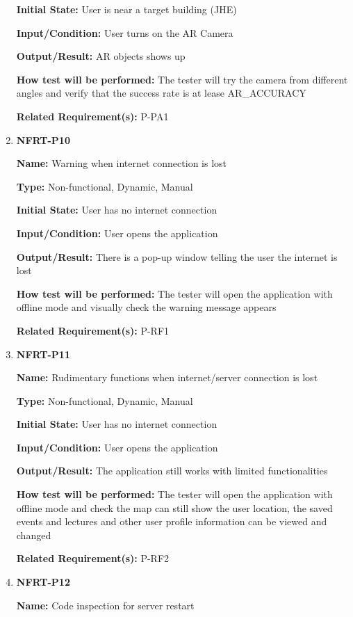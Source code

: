 \documentclass[12pt, titlepage]{article}
\begin{document}
\begin{enumerate}
\textbf{Initial State:} User is near a target building (JHE)
					
\textbf{Input/Condition:} User turns on the AR Camera
					
\textbf{Output/Result:} AR objects shows up

\textbf{How test will be performed:} The tester will try the camera from different angles and verify that the success rate is at lease AR\_ACCURACY

\textbf{Related Requirement(s):} P-PA1

\item{\textbf{NFRT-P10}}

\textbf{Name:} Warning when internet connection is lost

\textbf{Type:} Non-functional, Dynamic, Manual
					
\textbf{Initial State:} User has no internet connection
					
\textbf{Input/Condition:} User opens the application
					
\textbf{Output/Result:} There is a pop-up window telling the user the internet is lost

\textbf{How test will be performed:} The tester will open the application with offline mode and visually check the warning message appears

\textbf{Related Requirement(s):} P-RF1

\item{\textbf{NFRT-P11}}

\textbf{Name:} Rudimentary functions when internet/server connection is lost

\textbf{Type:} Non-functional, Dynamic, Manual
					
\textbf{Initial State:} User has no internet connection
					
\textbf{Input/Condition:} User opens the application
					
\textbf{Output/Result:} The application still works with limited functionalities

\textbf{How test will be performed:} The tester will open the application with offline mode and check the map can still show the user location, the saved events and lectures and other user profile information can be viewed and changed

\textbf{Related Requirement(s):} P-RF2

\item{\textbf{NFRT-P12}}

\textbf{Name:} Code inspection for server restart


\end{enumerate}
\end{document}
